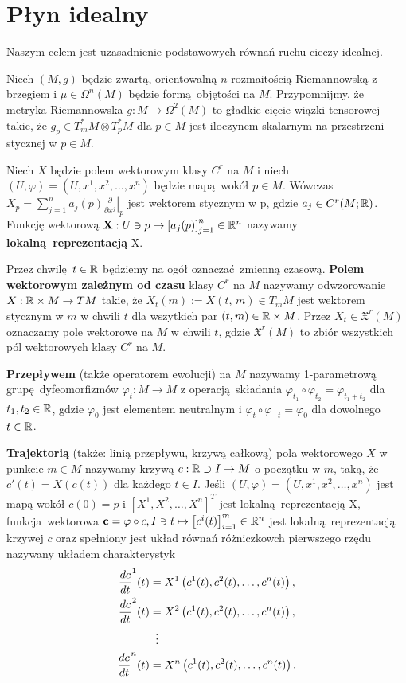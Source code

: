 \chapter{Płyn idealny} Naszym celem jest uzasadnienie podstawowych równań ruchu cieczy idealnej. 

Niech \((M, g)\) będzie zwartą, orientowalną \(n\)-rozmaitością Riemannowską z brzegiem i \(\mu \in \Omega^n(M)\) będzie formą objętości na \(M\). Przypomnijmy, że metryka Riemannowska \(g: M \rightarrow \Omega^2(M)\) to gładkie cięcie wiązki tensorowej takie, że \(g_p \in T_m^{\ast} M \otimes T_p^{\ast} M\) dla \(p\in M\) jest iloczynem skalarnym na przestrzeni stycznej w \(p\in M\).

Niech \(X\) będzie polem wektorowym klasy \(C^r\) na \(M\) i niech \((U, \varphi) = (U, x^1, x^2, \dots, x^n)\) będzie mapą wokół \(p\in M\). Wówczas \(X_p = \sum_{j=1}^{n}a_j(p)\left.\frac{\partial}{\partial x^j}\right|_p\) jest wektorem stycznym w p, gdzie \(a_j\in C^r(M; \mathbb{R})\). Funkcję wektorową \(\mathbf{X}: U\ni p \mapsto \left[a_j(p)\right]_{j=1}^n\in \mathbb{R}^n\) nazywamy \textbf{lokalną reprezentacją} X.

Przez chwilę \(t\in\mathbb{R}\) będziemy na ogół oznaczać zmienną czasową. \textbf{Polem wektorowym zależnym od czasu} klasy \(C^r\) na \(M\) nazywamy odwzorowanie \(X:\mathbb{R}\times M\rightarrow TM\) takie, że \(X_t(m):=X(t,\,m) \in T_{m} M\) jest wektorem stycznym w \(m\) w chwili \(t\) dla wszytkich par \((t, m) \in \mathbb{R} \times M\). Przez \(X_t\in \mathfrak{X}^r(M)\) oznaczamy pole wektorowe na \(M\) w chwili \(t\), gdzie \(\mathfrak{X}^r(M)\) to zbiór wszystkich pól wektorowych klasy \(C^r\) na \(M\). 

\textbf{Przepływem} (także operatorem ewolucji) na \(M\) nazywamy 1-parametrową grupę dyfeomorfizmów \(\varphi_t: M \rightarrow M\) z operacją składania \(\varphi_{t_1}\circ\varphi_{t_2} = \varphi_{t_1 + t_2}\) dla \(t_{1}, {t}_2 \in \mathbb{R}\), gdzie \(\varphi_0\) jest elementem neutralnym i \(\varphi_{t}\circ\varphi_{-t} = \varphi_0\) dla dowolnego \(t\in\mathbb{R}\).  

\textbf{Trajektorią} (także: linią przepływu, krzywą całkową) pola wektorowego \(X\) w punkcie \(m\in M\) nazywamy krzywą \(c: \mathbb{R} \supset I \rightarrow M\) o początku w \(m\), taką, że \(c'(t) = X(c(t))\) dla każdego \(t\in I\). Jeśli \((U, \varphi) = (U, x^1, x^2, \dots, x^n)\) jest mapą wokół \(c(0)=p\) i \([X^1, X^2, \dots, X^n]^T\) jest lokalną reprezentacją X, funkcja wektorowa \(\mathbf{c} = \varphi \circ c, I \ni t \mapsto \left[c^i(t)\right]_{i=1}^m \in \mathbb{R}^n\) jest lokalną reprezentacją krzywej \(c\) oraz spełniony jest układ równań różniczkowch pierwszego rzędu nazywany układem charakterystyk
\begin{align*}
    \frac{dc}{dt}^1(t) &= X^1\left(c^1(t), c^2(t), \dots, c^n(t)\right),\\
    \frac{dc}{dt}^2(t) &= X^2\left(c^1(t), c^2(t), \dots, c^n(t)\right),\\
    &\mathrel{\makebox[\widthof{=}]{\vdots}}  \\
    \frac{dc}{dt}^n(t) &= X^n\left(c^1(t), c^2(t), \dots, c^n(t)\right).
\end{align*}


